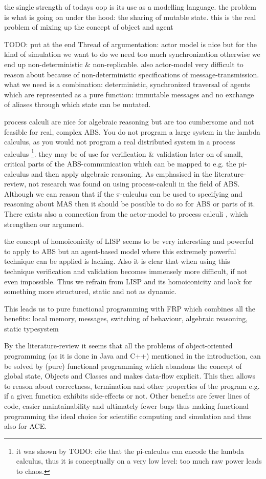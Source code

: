 the single strength of todays oop is its use as a modelling language. the problem is what is going on under the hood: the sharing of mutable state. this is the real problem of mixing up the concept of object and agent

TODO: put at the end
Thread of argumentation: actor model is nice but for the kind of simulation we want to do we need too much synchronization otherwise we end up non-deterministic \& non-replicable. also actor-model very difficult to reason about because of non-deterministic specifications of message-transmission. what we need is a combination: deterministic, synchronized traversal of agents which are represented as a pure function: immutable messages and no exchange of aliases through which state can be mutated.

process calculi are nice for algebraic reasoning but are too cumbersome and not feasible for real, complex ABS. You do not program a large system in the lambda calculus, as you would not program a real distributed system in a process calculus \footnote{it was shown by TODO: cite that the pi-calculus can encode the lambda calculus, thus it is conceptually on a very low level: too much raw power leads to chaos.}. they may be of use for verification \& validation later on of small, critical parts of the ABS-communication which can be mapped to e.g. the pi-calculus and then apply algebraic reasoning.
As emphasised in the literature-review, not research was found on using process-calculi in the field of ABS. Although we can reason that if the $\pi$-calculus can be used to specifying and reasoning about MAS then it should be possible to do so for ABS or parts of it. There exists also a connection from the actor-model to process calculi \cite{agha_foundation_1997}, which strengthen our argument. 

the concept of homoiconicity of LISP seems to be very interesting and powerful to apply to ABS but an agent-based model where this extremely powerful technique can be applied is lacking. Also it is clear that when using this technique verification and validation becomes immensely more difficult, if not even impossible. Thus we refrain from LISP and its homoiconicity and look for something more structured, static and not as dynamic.

This leads us to pure functional programming with FRP which combines all the benefits: local memory, messages, switching of behaviour, algebraic reasoning, static typesystem

By the literature-review it seems that all the problems of object-oriented programming (as it is done in Java and C++) mentioned in the introduction, can be solved by (pure) functional programming which abandons the concept of global state, Objects and Classes and makes data-flow explicit. This then allows to reason about correctness, termination and other properties of the program e.g. if a given function exhibits side-effects or not. Other benefits are fewer lines of code, easier maintainability and ultimately fewer bugs thus making functional programming the ideal choice for scientific computing and simulation and thus also for ACE.

